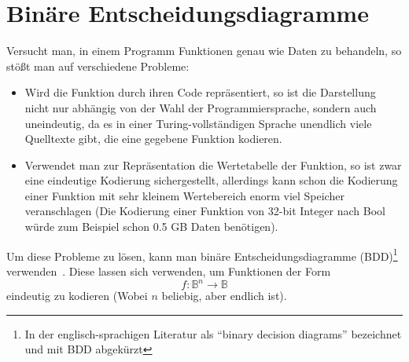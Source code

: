 \section{Binäre Entscheidungsdiagramme}
\label{sec:bdd}
Versucht man, in einem Programm Funktionen genau wie Daten zu behandeln, so stößt man auf verschiedene Probleme:
\begin{itemize}
\item Wird die Funktion durch ihren Code repräsentiert, so ist die Darstellung nicht nur abhängig von der Wahl der Programmiersprache, sondern auch uneindeutig, da es in einer Turing-vollständigen Sprache unendlich viele Quelltexte gibt, die eine gegebene Funktion kodieren.
\item Verwendet man zur Repräsentation die Wertetabelle der Funktion, so ist zwar eine eindeutige Kodierung sichergestellt, allerdings kann schon die Kodierung einer Funktion mit sehr kleinem Wertebereich enorm viel Speicher veranschlagen (Die Kodierung einer Funktion von 32-bit Integer nach Bool würde zum Beispiel schon 0.5 GB Daten benötigen).
\end{itemize}
Um diese Probleme zu lösen, kann man binäre Entscheidungsdiagramme (BDD)\footnote{In der englisch-sprachigen Literatur als "`binary decision diagrams"' bezeichnet und mit BDD abgekürzt} verwenden~\cite{knuth2011computer}.
Diese lassen sich verwenden, um Funktionen der Form
\[ f : \mathbb{B}^n\rightarrow\mathbb{B} \]
eindeutig zu kodieren (Wobei $n$ beliebig, aber endlich ist).


